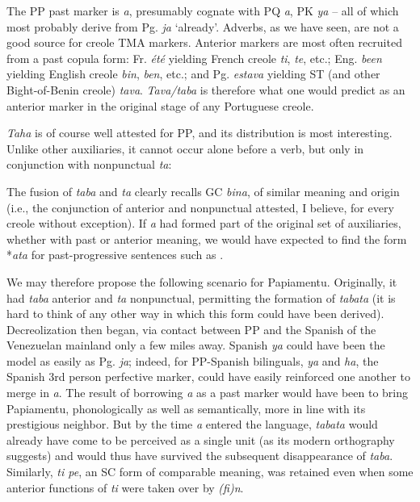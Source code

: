 The PP past marker is \textit{a}, presumably cognate with PQ \textit{a}, PK \textit{ya} -- all of which most probably derive from Pg. \textit{ja} `already'. Adverbs, as we have seen, are not a good source for creole TMA markers. Anterior markers are most often recruited from a past copula form: Fr. \textit{été} yielding French creole \textit{ti}, \textit{te}, etc.; Eng. \textit{been} yielding English creole \textit{bin}, \textit{ben}, etc.; and Pg. \textit{estava} yielding ST (and other Bight-of-Benin creole) \textit{tava}. \textit{Tava/taba} is therefore what one would predict as an anterior marker in the original stage of any Portuguese creole.

\textit{Taha} is of course well attested for PP, and its distribution is most interesting. Unlike other auxiliaries, it cannot occur alone before a verb, but only in conjunction with nonpunctual \textit{ta}:

\label{ex:2:95}\z

\label{ex:2:96}\z



\label{ex:2:97}\z


\label{ex:2:98}\z

The fusion of \textit{taba} and \textit{ta} clearly recalls GC \textit{bina}, of similar meaning and origin (i.e., the conjunction of anterior and nonpunctual attested, I believe, for every creole without exception). If \textit{a} had formed part of the original set of auxiliaries, whether with past or anterior meaning, we would have expected to find the form *\textit{ata} for past-progressive sentences such as .

We may therefore propose the following scenario for Papiamentu. Originally, it had \textit{taba} anterior and \textit{ta} nonpunctual, permitting the formation of \textit{tabata} (it is hard to think of any other way in which this form could have been derived). Decreolization then began, via contact between PP and the Spanish of the Venezuelan mainland only a few miles away. Spanish \textit{ya} could have been the model as easily as Pg. \textit{ja}; indeed, for PP-Spanish bilinguals, \textit{ya} and \textit{ha}, the Spanish 3rd person perfective marker, could have easily reinforced one another to merge in \textit{a}. The result of borrowing \textit{a} as a past marker would have been to bring Papiamentu, phonologically as well as semantically, more in line with its prestigious neighbor. But by the time \textit{a} entered the language, \textit{tabata} would already have come to be perceived as a single unit (as its modern orthography suggests) and would thus have survived the subsequent disappearance of \textit{taba}. Similarly, \textit{ti pe}, an SC form of comparable meaning, was retained even when some anterior functions of \textit{ti} were taken over by \textit{(fi)n}.

